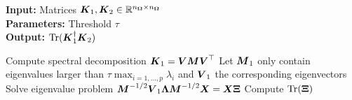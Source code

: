 \hspace*{\algorithmicindent} \textbf{Input:} Matrices $\boldsymbol{K}_1, \boldsymbol{K}_2 \in \mathbb{R}^{n_{\boldsymbol{\Omega}} \times n_{\boldsymbol{\Omega}}}$ \\
\hspace*{\algorithmicindent} \textbf{Parameters:} Threshold $\tau$ \\
\hspace*{\algorithmicindent} \textbf{Output:} $\operatorname{Tr}(\boldsymbol{K}_1^{\dagger} \boldsymbol{K}_2)$
\begin{algorithmic}[1]
    \State Compute spectral decomposition $\boldsymbol{K}_1 = \boldsymbol{V} \boldsymbol{M} \boldsymbol{V}^{\top}$
    \State Let $\boldsymbol{M}_1$ only contain eigenvalues larger than $\tau \max_{i=1, \dots, p} \lambda_i$ and $\boldsymbol{V}_1$ the corresponding eigenvectors
    \State Solve eigenvalue problem $\boldsymbol{M}^{-1/2} \boldsymbol{V}_1 \boldsymbol{\Lambda} \boldsymbol{M}^{-1/2} \boldsymbol{X} = \boldsymbol{X} \boldsymbol{\Xi}$
    \State Compute $\operatorname{Tr}(\boldsymbol{\Xi})$
\end{algorithmic}
